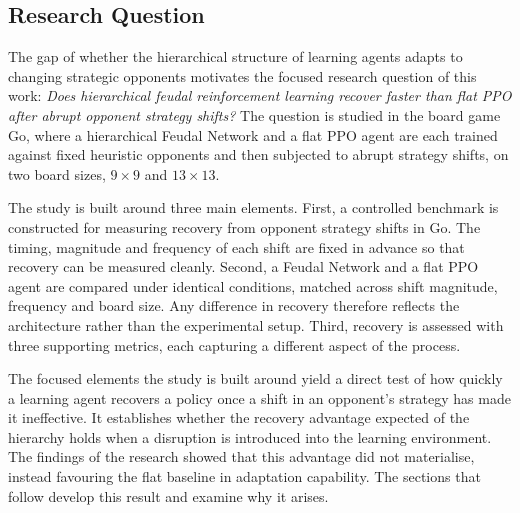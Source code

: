 \documentclass[sigconf,nonacm]{acmart}
\begin{document}
\subsection{Research Question}

The gap of whether the hierarchical structure of learning agents adapts to changing strategic opponents motivates the focused research question of this work: \emph{Does hierarchical feudal reinforcement learning recover faster than flat PPO after abrupt opponent strategy shifts?} The question is studied in
the board game Go, where a hierarchical Feudal Network and a flat PPO agent are
each trained against fixed heuristic opponents and then subjected to abrupt
strategy shifts, on two board sizes, $9\times9$ and $13\times13$.

The study is built around three main elements. First, a controlled benchmark is
constructed for measuring recovery from opponent strategy shifts in Go. The timing, magnitude and frequency of each shift are fixed in advance so that recovery can be measured cleanly. Second, a Feudal Network and a flat PPO agent
are compared under identical conditions, matched across shift magnitude,
frequency and board size. Any difference in recovery therefore reflects the architecture rather than the experimental setup. Third, recovery is assessed
with three supporting metrics, each capturing a different aspect of the
process.

The focused elements the study is built around yield a direct test of how quickly a learning agent recovers a policy once a shift in an opponent's strategy has made it ineffective. It establishes whether the recovery advantage expected of the hierarchy holds when a disruption is introduced into the learning environment. The findings of the research showed that this advantage did not materialise, instead favouring the flat baseline in adaptation capability. The sections that follow develop this result and examine why it arises.
\end{document}
